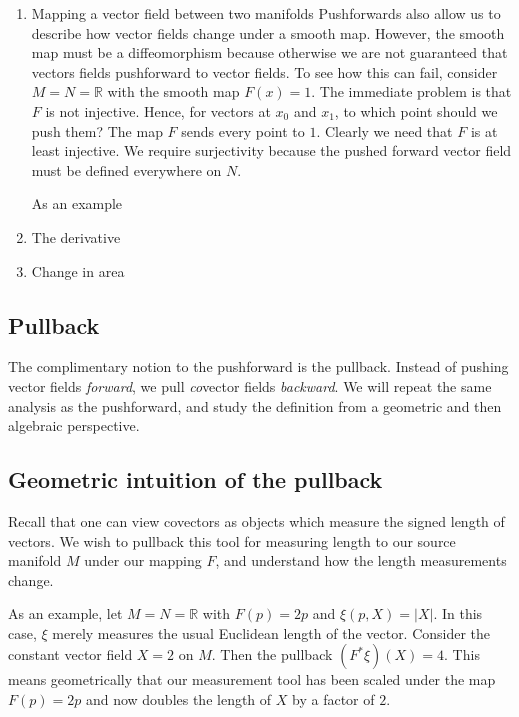 \documentclass[12pt,letterpaper,boxed]{article}
\newcommand{\R}{{\mathbb{R}}}
\newcommand{\abs}[1]{\left| #1 \right|}
\begin{document}
\begin{enumerate}
	\item Mapping a vector field between two manifolds
	Pushforwards also allow us to describe how vector fields change under a smooth map. However, the smooth map must be a diffeomorphism because otherwise we are not guaranteed that vectors fields pushforward to vector fields. To see how this can fail, consider $M = N = \R$ with the smooth map $F(x) = 1$. The immediate problem is that $F$ is not injective. Hence, for vectors at $x_0$ and $x_1$, to which point should we push them? The map $F$ sends every point to $1$. Clearly we need that $F$ is at least injective. We require surjectivity because the pushed forward vector field must be defined everywhere on $N$.  

	As an example 
	\item The derivative
	\item Change in area
\end{enumerate}

\subsection{Pullback}
The complimentary notion to the pushforward is the pullback. Instead of pushing vector fields \textit{forward}, we pull \textit{co}vector fields \textit{backward}. We will repeat the same analysis as the pushforward, and study the definition from a geometric and then algebraic perspective.

\subsection{Geometric intuition of the pullback}
Recall that one can view covectors as objects which measure the signed length of vectors. We wish to pullback this tool for measuring length to our source manifold $M$ under our mapping $F$, and understand how the length measurements change.

As an example, let $M = N = \R$ with $F(p) = 2p$ and $\xi(p, X) = \abs{X}$. In this case, $\xi$ merely measures the usual Euclidean length of the vector. Consider the constant vector field $X = 2$ on $M$. Then the pullback $(F^* \xi)(X) = 4$. This means geometrically that our measurement tool has been scaled under the map $F(p) = 2p$ and now doubles the length of $X$ by a factor of $2$.
\end{document}
